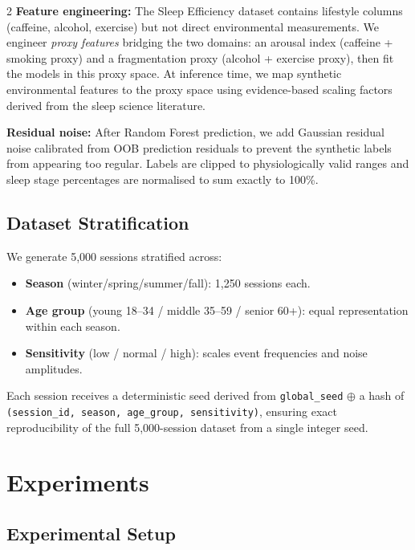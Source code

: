 \documentclass[11pt,a4paper]{article}
\begin{document}
\begin{multicols}{2}
\textbf{Feature engineering:}
The Sleep Efficiency dataset contains lifestyle columns (caffeine, alcohol,
exercise) but not direct environmental measurements.  We engineer \textit{proxy
features} bridging the two domains: an arousal index (caffeine + smoking proxy)
and a fragmentation proxy (alcohol + exercise proxy), then fit the models in
this proxy space.  At inference time, we map synthetic environmental features
to the proxy space using evidence-based scaling factors derived from the sleep
science literature.

\textbf{Residual noise:}
After Random Forest prediction, we add Gaussian residual noise calibrated from
OOB prediction residuals to prevent the synthetic labels from appearing too
regular.  Labels are clipped to physiologically valid ranges and sleep stage
percentages are normalised to sum exactly to 100\%.

\subsection{Dataset Stratification}

We generate 5,000 sessions stratified across:
\begin{itemize}\setlength\itemsep{0pt}
  \item \textbf{Season} (winter/spring/summer/fall): 1,250 sessions each.
  \item \textbf{Age group} (young 18–34 / middle 35–59 / senior 60+): equal
        representation within each season.
  \item \textbf{Sensitivity} (low / normal / high): scales event frequencies
        and noise amplitudes.
\end{itemize}

Each session receives a deterministic seed derived from \texttt{global\_seed}
$\oplus$ a hash of \texttt{(session\_id, season, age\_group, sensitivity)},
ensuring exact reproducibility of the full 5,000-session dataset from a single
integer seed.

\section{Experiments}

\subsection{Experimental Setup}


\end{multicols}
\end{document}
